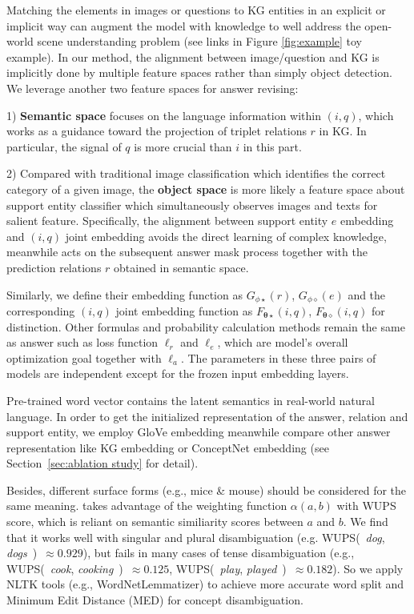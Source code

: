 \documentclass[runningheads]{llncs}
\newcommand{\jeff}[1]{{\color{black}#1}}
\begin{document}
Matching the elements in images or questions to KG entities in an explicit \cite{DBLP:journals/pami/WangWSDH18} or implicit \cite{DBLP:journals/ivc/FaraziKB20} way can augment the model with knowledge to well address the open-world scene understanding problem (see links in Figure \ref{fig:example} toy example). In our method, the alignment between image/question and KG is implicitly done by multiple feature spaces rather than simply object detection. We leverage another two feature spaces for answer revising:

1) \textbf{Semantic space} focuses on the language information within $(i, q)$, which works as a guidance toward the projection of triplet relations $r$ in KG. In particular, the signal of $q$ is more crucial than $i$ in this part.

2) Compared with traditional image classification which identifies the correct category of a given image, the \textbf{object space} is more likely a feature space about support entity classifier which simultaneously observes images and texts for salient feature. 
Specifically, the alignment between support entity $e$ embedding and  $(i, q)$ joint embedding avoids the direct learning of complex knowledge, meanwhile acts on the subsequent answer mask process together with the prediction relations $r$ obtained in semantic space. 

Similarly, we define their embedding function as $G_{\phi\star}(r)$, $G_{\phi\diamond}(e)$ and the corresponding  $(i, q)$ joint embedding function as $F_{\boldsymbol{\theta\star}}\left(i, q\right)$, $F_{\boldsymbol{\theta\diamond}}\left(i, q\right)$ for distinction.
Other formulas and probability calculation methods remain the same as answer such as loss function $\ell_{r}$ and $\ell_{e}$, which are model's overall optimization goal together with $\ell_{a}$. The parameters in these three pairs of models are independent except for the frozen input embedding layers.

Pre-trained word vector contains the latent semantics in real-world natural language. In order to get the initialized representation of the answer, relation and support entity, we employ GloVe embedding \cite{DBLP:conf/emnlp/PenningtonSM14} meanwhile  compare other answer representation like KG embedding \cite{DBLP:conf/nips/BordesUGWY13} or ConceptNet embedding \cite{DBLP:conf/aaai/MalaviyaBBC20} (see Section~\ref{sec:ablation study} for detail).

Besides,  
\jeff{different surface forms (e.g., mice \& mouse) should be considered for the same meaning}. 
\cite{DBLP:conf/cvpr/HuCS18} takes advantage of the weighting function $\alpha(a, b)$ with WUPS score, which is reliant on semantic similiarity scores between $a$ and $b$. We find that it works well with singular and plural disambiguation (e.g. WUPS(~{\it dog}, {\it dogs}~)~$\approx0.929$), but fails in many cases of tense disambiguation (e.g., WUPS(~{\it cook}, {\it cooking}~)~$\approx0.125$, WUPS(~{\it play}, {\it played}~)~$\approx0.182$). 
So we apply NLTK tools (e.g., WordNetLemmatizer) to achieve more accurate word split and Minimum Edit Distance (MED) for concept disambiguation.
\end{document}
